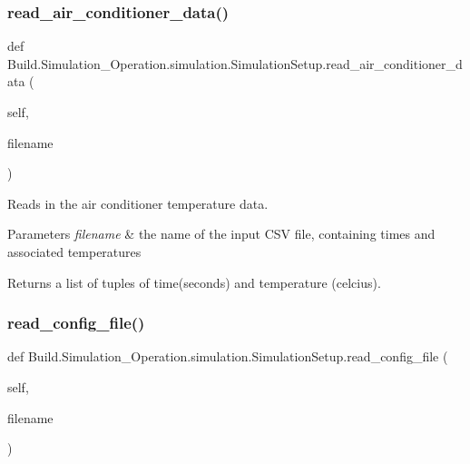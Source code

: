\subsubsection{\texorpdfstring{read\+\_\+air\+\_\+conditioner\+\_\+data()}{read\_air\_conditioner\_data()}}
{\footnotesize\ttfamily def Build.\+Simulation\+\_\+\+Operation.\+simulation.\+Simulation\+Setup.\+read\+\_\+air\+\_\+conditioner\+\_\+data (\begin{DoxyParamCaption}\item[{}]{self,  }\item[{}]{filename }\end{DoxyParamCaption})}



Reads in the air conditioner temperature data. 


\begin{DoxyParams}{Parameters}
{\em filename} & the name of the input C\+SV file, containing times and associated temperatures \\
\hline
\end{DoxyParams}
\begin{DoxyReturn}{Returns}
a list of tuples of time(seconds) and temperature (celcius). 
\end{DoxyReturn}
\mbox{\label{class_build_1_1_simulation___operation_1_1simulation_1_1_simulation_setup_a7b0667f9c521eecef17941c07b091fa2}} 
\subsubsection{\texorpdfstring{read\+\_\+config\+\_\+file()}{read\_config\_file()}}
{\footnotesize\ttfamily def Build.\+Simulation\+\_\+\+Operation.\+simulation.\+Simulation\+Setup.\+read\+\_\+config\+\_\+file (\begin{DoxyParamCaption}\item[{}]{self,  }\item[{}]{filename }\end{DoxyParamCaption})}



